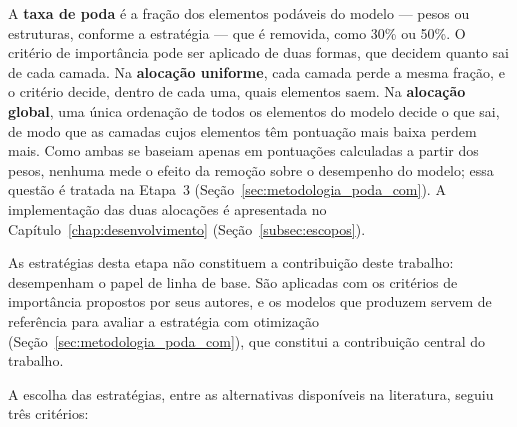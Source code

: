 A \textbf{taxa de poda} é a fração dos elementos podáveis do modelo --- pesos ou
estruturas, conforme a estratégia --- que é removida, como 30\% ou 50\%. O critério de
importância pode ser aplicado de duas formas, que decidem quanto sai de cada camada. Na
\textbf{alocação uniforme}, cada camada perde a mesma fração, e o critério decide, dentro de
cada uma, quais elementos saem. Na \textbf{alocação global}, uma única ordenação de todos os
elementos do modelo decide o que sai, de modo que as camadas cujos elementos têm pontuação
mais baixa perdem mais. Como ambas se baseiam apenas em pontuações calculadas a partir dos
pesos, nenhuma mede o efeito da remoção sobre o desempenho do modelo; essa questão é tratada na
Etapa~3 (Seção~\ref{sec:metodologia_poda_com}). A implementação das duas alocações é
apresentada no Capítulo~\ref{chap:desenvolvimento} (Seção~\ref{subsec:escopos}).


As estratégias desta etapa não constituem a contribuição deste trabalho: desempenham o
papel de linha de base. São aplicadas com os critérios de importância propostos por seus
autores, e os modelos que produzem servem de referência para avaliar a estratégia com
otimização (Seção~\ref{sec:metodologia_poda_com}), que constitui a contribuição central do
trabalho.

A escolha das estratégias, entre as alternativas disponíveis na literatura, seguiu
três critérios:

